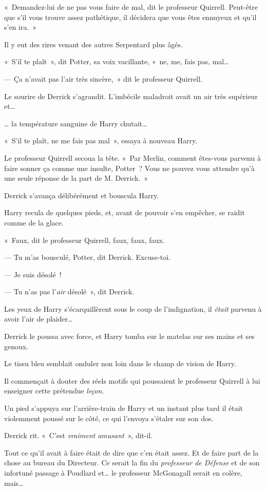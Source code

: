 «~Demandez-lui de ne pas vous faire de mal, dit le professeur Quirrell.
Peut-être que s'il vous trouve assez pathétique, il décidera que vous êtes ennuyeux et qu'il s'en ira.~»

Il y eut des rires venant des autres Serpentard plus âgés.

«~S'il te plaît~», dit Potter, sa voix vacillante, «~ne, me, fais pas, mal…

--- Ça n'avait pas l'air très sincère,~» dit le professeur Quirrell.

Le sourire de Derrick s'agrandit.
L'imbécile maladroit avait un air très supérieur et…

… la température sanguine de Harry chutait…

«~S'il te plaît, ne me fais pas mal~», essaya à nouveau Harry.

Le professeur Quirrell secoua la tête.
«~Par Merlin, comment êtes-vous parvenu à faire sonner ça comme une insulte, Potter~?
Vous ne pouvez vous attendre qu'à une seule réponse de la part de M. Derrick.~»

Derrick s'avança délibérément et bouscula Harry.

Harry recula de quelques pieds, et, avant de pouvoir s'en empêcher, se raidit comme de la glace.

«~Faux, dit le professeur Quirrell, faux, faux, faux.

--- Tu m'as bousculé, Potter, dit Derrick.
Excuse-toi.

--- Je suis désolé~!

--- Tu n'as pas l'\emph{air} désolé~», dit Derrick.

Les yeux de Harry s'écarquillèrent sous le coup de l'indignation, il \emph{était} parvenu à avoir l'air de plaider…

Derrick le poussa avec force, et Harry tomba sur le matelas sur ses mains et ses genoux.

Le tissu bleu semblait onduler non loin dans le champ de vision de Harry.

Il commençait à douter des réels motifs qui poussaient le professeur Quirrell à lui enseigner cette prétendue \emph{leçon}.

Un pied s'appuya sur l'arrière-train de Harry et un instant plus tard il était violemment poussé sur le côté, ce qui l'envoya s'étaler sur son dos.

Derrick rit.
«~C'est \emph{vraiment amusant}~», dit-il.

Tout ce qu'il avait à faire était de dire que c'en était assez.
Et de faire part de la chose au bureau du Directeur.
Ce serait la fin du \emph{professeur de Défense} et de son infortuné passage à Poudlard et… le professeur McGonagall serait en colère, mais…

